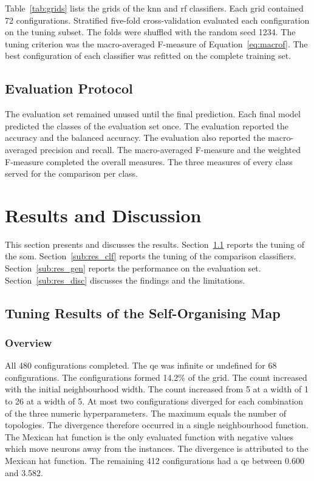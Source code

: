 \documentclass[conference]{IEEEtran}
\begin{document}
Table~\ref{tab:grids} lists the grids of the \gls{knn} and \gls{rf} classifiers.
Each grid contained 72 configurations.
Stratified five-fold cross-validation evaluated each configuration on the tuning subset.
The folds were shuffled with the random seed 1234.
The tuning criterion was the macro-averaged F-measure of Equation~\eqref{eq:macrof}.
The best configuration of each classifier was refitted on the complete training set.

\subsection{Evaluation Protocol}
\label{sub:evalproc}

The evaluation set remained unused until the final prediction.
Each final model predicted the classes of the evaluation set once.
The evaluation reported the accuracy and the balanced accuracy.
The evaluation also reported the macro-averaged precision and recall.
The macro-averaged F-measure and the weighted F-measure completed the overall measures.
The three measures of every class served for the comparison per class.


\section{Results and Discussion}
\label{sec:results}

This section presents and discusses the results.
Section~\ref{sub:res_som} reports the tuning of the \gls{som}.
Section~\ref{sub:res_clf} reports the tuning of the comparison classifiers.
Section~\ref{sub:res_gen} reports the performance on the evaluation set.
Section~\ref{sub:res_disc} discusses the findings and the limitations.

\subsection{Tuning Results of the Self-Organising Map}
\label{sub:res_som}

\subsubsection{Overview}

All 480 configurations completed.
The \gls{qe} was infinite or undefined for 68 configurations.
The configurations formed 14.2\% of the grid.
The count increased with the initial neighbourhood width.
The count increased from 5 at a width of 1 to 26 at a width of 5.
At most two configurations diverged for each combination of the three numeric hyperparameters.
The maximum equals the number of topologies.
The divergence therefore occurred in a single neighbourhood function.
The Mexican hat function is the only evaluated function with negative values which move neurons away from the instances.
The divergence is attributed to the Mexican hat function.
The remaining 412 configurations had a \gls{qe} between 0.600 and 3.582.
\end{document}
